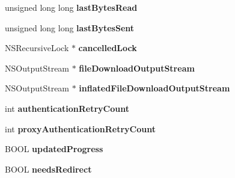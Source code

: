 \begin{DoxyCompactItemize}
\item 
\hypertarget{interface_a_s_i_h_t_t_p_request_07_08_abe92cd7b2761e15991aec8de0250f9b9}{
unsigned long long {\bfseries last\-Bytes\-Read}}
\label{interface_a_s_i_h_t_t_p_request_07_08_abe92cd7b2761e15991aec8de0250f9b9}

\item 
\hypertarget{interface_a_s_i_h_t_t_p_request_07_08_a6ad30c31b9fd6c16b9c9a62952ae77e5}{
unsigned long long {\bfseries last\-Bytes\-Sent}}
\label{interface_a_s_i_h_t_t_p_request_07_08_a6ad30c31b9fd6c16b9c9a62952ae77e5}

\item 
\hypertarget{interface_a_s_i_h_t_t_p_request_07_08_acffeb50dca1da08205f9c904c6771da3}{
\-N\-S\-Recursive\-Lock $\ast$ {\bfseries cancelled\-Lock}}
\label{interface_a_s_i_h_t_t_p_request_07_08_acffeb50dca1da08205f9c904c6771da3}

\item 
\hypertarget{interface_a_s_i_h_t_t_p_request_07_08_a5d38e1eed5fa97133ae57f4b0a6a5c90}{
\-N\-S\-Output\-Stream $\ast$ {\bfseries file\-Download\-Output\-Stream}}
\label{interface_a_s_i_h_t_t_p_request_07_08_a5d38e1eed5fa97133ae57f4b0a6a5c90}

\item 
\hypertarget{interface_a_s_i_h_t_t_p_request_07_08_a922773805c23bc568f484747df54da77}{
\-N\-S\-Output\-Stream $\ast$ {\bfseries inflated\-File\-Download\-Output\-Stream}}
\label{interface_a_s_i_h_t_t_p_request_07_08_a922773805c23bc568f484747df54da77}

\item 
\hypertarget{interface_a_s_i_h_t_t_p_request_07_08_a169c8c290fda5bc94b71dbb9c69e7251}{
int {\bfseries authentication\-Retry\-Count}}
\label{interface_a_s_i_h_t_t_p_request_07_08_a169c8c290fda5bc94b71dbb9c69e7251}

\item 
\hypertarget{interface_a_s_i_h_t_t_p_request_07_08_a086cb92e50d72dead028c4b3004dd5cb}{
int {\bfseries proxy\-Authentication\-Retry\-Count}}
\label{interface_a_s_i_h_t_t_p_request_07_08_a086cb92e50d72dead028c4b3004dd5cb}

\item 
\hypertarget{interface_a_s_i_h_t_t_p_request_07_08_a3429ad8370d550db3d6c1c909c878a1f}{
\-B\-O\-O\-L {\bfseries updated\-Progress}}
\label{interface_a_s_i_h_t_t_p_request_07_08_a3429ad8370d550db3d6c1c909c878a1f}

\item 
\hypertarget{interface_a_s_i_h_t_t_p_request_07_08_a97606868669080c88a2ccd8edf267ee4}{
\-B\-O\-O\-L {\bfseries needs\-Redirect}}
\label{interface_a_s_i_h_t_t_p_request_07_08_a97606868669080c88a2ccd8edf267ee4}


\end{DoxyCompactItemize}
